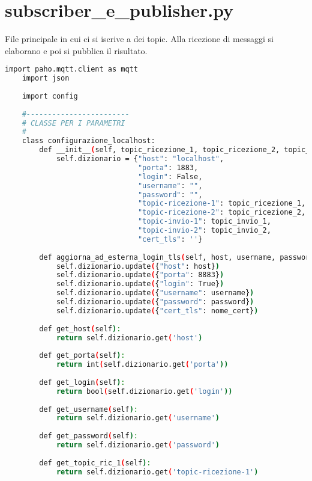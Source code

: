 \section*{subscriber\_e\_publisher.py}
\label{sec:client-appendix-subpub-main}
File principale in cui ci si iscrive a dei topic.
Alla ricezione di messaggi si elaborano e poi si pubblica il risultato.
\begin{lstlisting}[language=bash]
    import paho.mqtt.client as mqtt
    import json
    
    import config
      
    #------------------------
    # CLASSE PER I PARAMETRI
    #
    class configurazione_localhost:
        def __init__(self, topic_ricezione_1, topic_ricezione_2, topic_invio_1, topic_invio_2):
            self.dizionario = {"host": "localhost",
                               "porta": 1883,
                               "login": False,
                               "username": "",
                               "password": "",
                               "topic-ricezione-1": topic_ricezione_1,
                               "topic-ricezione-2": topic_ricezione_2,
                               "topic-invio-1": topic_invio_1,
                               "topic-invio-2": topic_invio_2,
                               "cert_tls": ''}
        
        def aggiorna_ad_esterna_login_tls(self, host, username, password, nome_cert):
            self.dizionario.update({"host": host})
            self.dizionario.update({"porta": 8883})
            self.dizionario.update({"login": True})
            self.dizionario.update({"username": username})
            self.dizionario.update({"password": password})
            self.dizionario.update({"cert_tls": nome_cert})
    
        def get_host(self): 
            return self.dizionario.get('host')
        
        def get_porta(self):
            return int(self.dizionario.get('porta'))
    
        def get_login(self):
            return bool(self.dizionario.get('login'))
    
        def get_username(self):
            return self.dizionario.get('username')
    
        def get_password(self):
            return self.dizionario.get('password')
    
        def get_topic_ric_1(self):
            return self.dizionario.get('topic-ricezione-1')
            

\end{lstlisting}
